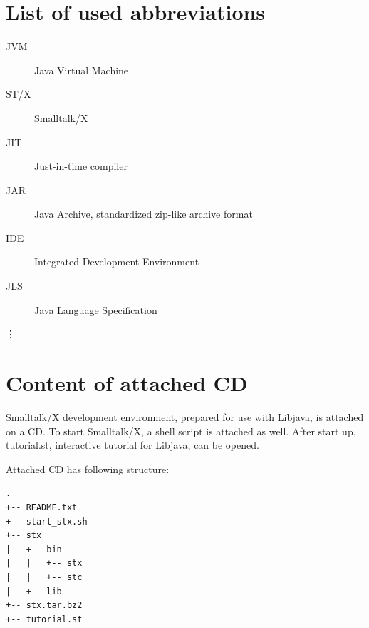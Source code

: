 \documentclass[11pt,twoside,a4paper]{book}
\let\Chapter\chapter
\def\chapter{\addtocontents{lol}{\protect\addvspace{10pt}}\Chapter}
\begin{document}


\appendix



\chapter{List of used abbreviations}

\begin{description}
\item[JVM] Java Virtual Machine
\item[ST/X] Smalltalk/X
\item[JIT] Just-in-time compiler
\item[JAR] Java Archive, standardized zip-like archive format
\item[IDE] Integrated Development Environment
\item[JLS] Java Language Specification
\end{description}
\vdots

\chapter{Content of attached CD}

Smalltalk/X development environment, prepared for use with Libjava, is attached on a CD.
To start Smalltalk/X, a shell script is attached as well.
After start up, tutorial.st, interactive tutorial for Libjava, can be opened.

Attached CD has following structure:

\begin{verbatim}
.
+-- README.txt
+-- start_stx.sh
+-- stx
|   +-- bin
|   |   +-- stx
|   |   +-- stc
|   +-- lib
+-- stx.tar.bz2
+-- tutorial.st
\end{verbatim}

\end{document}
